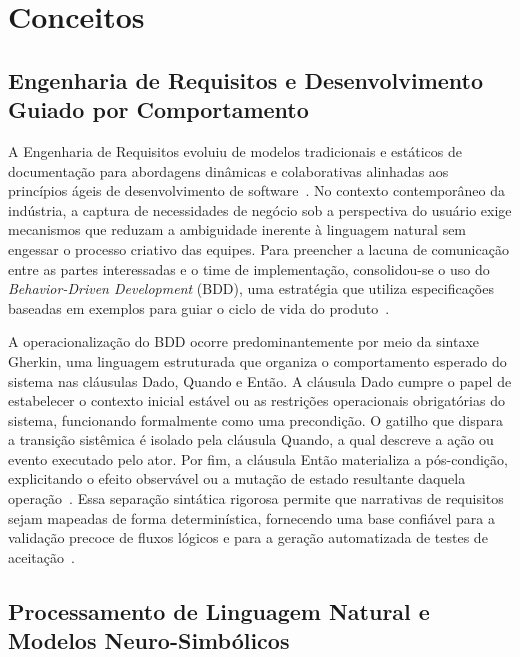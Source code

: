 \documentclass[ruledheader]{abnt_UFF}[abntex2]
\begin{document}


\chapter{Conceitos}
\label{cap2:title}


\section{Engenharia de Requisitos e Desenvolvimento Guiado por Comportamento}

A Engenharia de Requisitos evoluiu de modelos tradicionais e estáticos de documentação para abordagens dinâmicas e colaborativas alinhadas aos princípios ágeis de desenvolvimento de software~\cite{gonzalez2022improving}. No contexto contemporâneo da indústria, a captura de necessidades de negócio sob a perspectiva do usuário exige mecanismos que reduzam a ambiguidade inerente à linguagem natural sem engessar o processo criativo das equipes. Para preencher a lacuna de comunicação entre as partes interessadas e o time de implementação, consolidou-se o uso do \textit{Behavior-Driven Development} (BDD), uma estratégia que utiliza especificações baseadas em exemplos para guiar o ciclo de vida do produto~\cite{gonzalez2022improving}.

A operacionalização do BDD ocorre predominantemente por meio da sintaxe Gherkin, uma linguagem estruturada que organiza o comportamento esperado do sistema nas cláusulas Dado, Quando e Então. A cláusula Dado cumpre o papel de estabelecer o contexto inicial estável ou as restrições operacionais obrigatórias do sistema, funcionando formalmente como uma precondição. O gatilho que dispara a transição sistêmica é isolado pela cláusula Quando, a qual descreve a ação ou evento executado pelo ator. Por fim, a cláusula Então materializa a pós-condição, explicitando o efeito observável ou a mutação de estado resultante daquela operação~\cite{fischbach2023automatic}. Essa separação sintática rigorosa permite que narrativas de requisitos sejam mapeadas de forma determinística, fornecendo uma base confiável para a validação precoce de fluxos lógicos e para a geração automatizada de testes de aceitação~\cite{fischbach2023automatic}.

\section{Processamento de Linguagem Natural e Modelos Neuro-Simbólicos}
\end{document}

